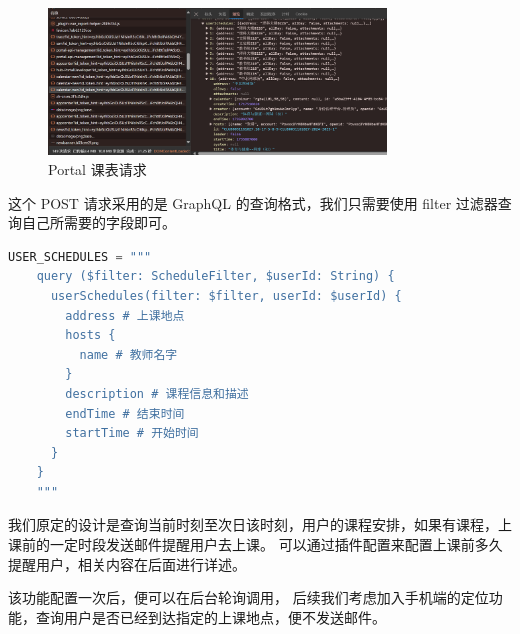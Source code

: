 \begin{figure}[H]
    \centering
    \includegraphics[width=0.8\textwidth]{img/calendar-new-url.png}
    \caption{Portal 课表请求}
    \label{fig:portal_course_table}
\end{figure}

这个 POST 请求采用的是 GraphQL 的查询格式，我们只需要使用 filter 过滤器查询自己所需要的字段即可。

\begin{lstlisting}[language=python]
    USER_SCHEDULES = """
    query ($filter: ScheduleFilter, $userId: String) {
      userSchedules(filter: $filter, userId: $userId) {
        address # 上课地点
        hosts {
          name # 教师名字
        }
        description # 课程信息和描述
        endTime # 结束时间
        startTime # 开始时间
      }
    }
    """
\end{lstlisting}

我们原定的设计是查询当前时刻至次日该时刻，用户的课程安排，如果有课程，上课前的一定时段发送邮件提醒用户去上课。
可以通过插件配置来配置上课前多久提醒用户，相关内容在后面进行详述。

\begin{rmr}
    该功能配置一次后，便可以在后台轮询调用，
    后续我们考虑加入手机端的定位功能，查询用户是否已经到达指定的上课地点，便不发送邮件。
\end{rmr}